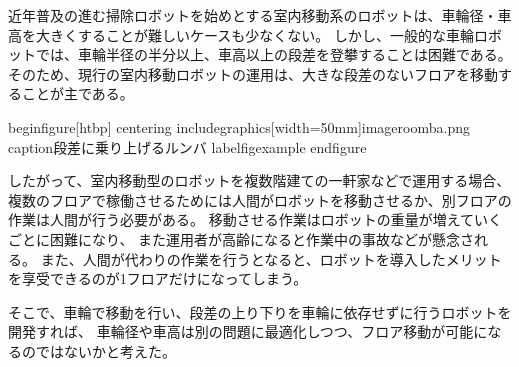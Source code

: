 近年普及の進む掃除ロボットを始めとする室内移動系のロボットは、車輪径・車高を大きくすることが難しいケースも少なくない。
しかし、一般的な車輪ロボットでは、車輪半径の半分以上、車高以上の段差を登攀することは困難である。
そのため、現行の室内移動ロボットの運用は、大きな段差のないフロアを移動することが主である。

begin{figure}[htbp]
  centering
  includegraphics[width=50mm]{imageroomba.png}
  caption{段差に乗り上げるルンバ}
  label{figexample}
  end{figure}

したがって、室内移動型のロボットを複数階建ての一軒家などで運用する場合、
複数のフロアで稼働させるためには人間がロボットを移動させるか、別フロアの作業は人間が行う必要がある。
移動させる作業はロボットの重量が増えていくごとに困難になり、
また運用者が高齢になると作業中の事故などが懸念される。
また、人間が代わりの作業を行うとなると、ロボットを導入したメリットを享受できるのが1フロアだけになってしまう。


そこで、車輪で移動を行い、段差の上り下りを車輪に依存せずに行うロボットを開発すれば、
車輪径や車高は別の問題に最適化しつつ、フロア移動が可能になるのではないかと考えた。
